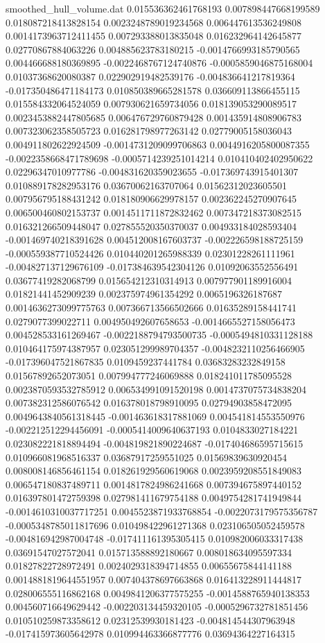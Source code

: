 \begin{filecontents}{smoothed_hull_volume.dat}
0.015536362461768193	0.007898447668199589	0.018087218413828154	0.0023248789019234568	0.006447613536249808	0.0014173963712411455	0.007293388013835048	0.016232964142645877	0.02770867884063226	0.004885623783180215	-0.0014766993185790565	0.004466688180369895	-0.0022468767124740876	-0.0005859046875168004	0.01037368620080387	0.022902919482539176	-0.004836641217819364	-0.017350486471184173	0.010850389665281578	0.036609113866455115
0.015584332064524059	0.007930621659734056	0.018139053290089517	0.0023453882447805685	0.006476729760879428	0.001435914808906783	0.007323062358505723	0.016281798977263142	0.02779005158036043	0.004911802622924509	-0.0014731209099706863	0.0044916205800087355	-0.0022358668471789698	-0.0005714239251014214	0.010410402402950622	0.02296347010977786	-0.004831620359023655	-0.017369743915401307	0.010889178282953176	0.03670062163707064
0.01562312023605501	0.007956795188431242	0.018180906629978157	0.002362245270907645	0.006500460802153737	0.0014511711872832462	0.007347218373082515	0.016321266509448047	0.027855520350370037	0.004933184028593404	-0.001469740218391628	0.004512008167603737	-0.002226598188725159	-0.000559387710524426	0.010440201265988339	0.02301228261111961	-0.004827137129676109	-0.017384639542304126	0.01092063552556491	0.03677419282068799
0.015654212310314913	0.007977901189916004	0.01821441452909239	0.002375974961354292	0.0065196326187687	0.0014636273099775763	0.007366713566502666	0.01635289158441741	0.0279077399022711	0.004950492607658653	-0.0014665527158056473	0.004528533161269467	-0.0022188794793500735	-0.0005494810331128188	0.010464175974387957	0.023051299989704357	-0.0048232110256466905	-0.017396047521867835	0.0109459237441784	0.03683283232849158
0.01567892652073051	0.007994777246069888	0.018241011785095528	0.0023870593532785912	0.006534991091520198	0.0014737075734838204	0.007382312586076542	0.016378018798910095	0.02794903858472095	0.0049643840561318445	-0.001463618317881069	0.004541814553550976	-0.002212512294456091	-0.0005414009640637193	0.0104833027184221	0.023082221818894494	-0.004819821890224687	-0.017404686595715615	0.010966081968516337	0.03687917259551025
0.01569839630920454	0.008008146856461154	0.018261929560619068	0.0023959208551849083	0.006547180837489711	0.0014817824986241668	0.007394675897440152	0.016397801472759398	0.027981411679754188	0.0049754281741949844	-0.0014610310037717251	0.0045523871933768854	-0.0022073179575356787	-0.0005348785011817696	0.010498422961271368	0.023106505052459578	-0.004816942987004748	-0.017411161395305415	0.010982006033317438	0.03691547027572041
0.015713588892180667	0.008018634095597334	0.01827822728972491	0.0024029318394714855	0.00655675844141188	0.0014881819644551957	0.007404378697663868	0.016413228911444817	0.028006555116862168	0.0049841206377575255	-0.0014588765940138353	0.004560716649629442	-0.002203134459320105	-0.0005296732781851456	0.010510259873358612	0.02312539930181423	-0.004814544307963948	-0.017415973605642978	0.010994463366877776	0.03694364227164315

\end{filecontents}
